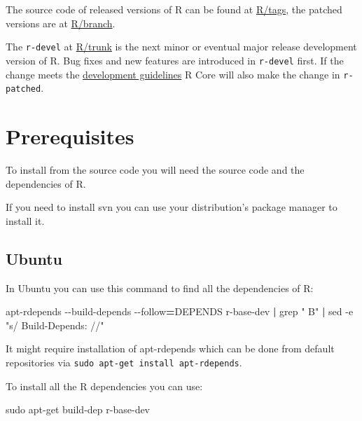 \documentclass[
]{book}
\newenvironment{Shaded}{\begin{snugshade}}{\end{snugshade}}
\newcommand{\AttributeTok}[1]{\textcolor[rgb]{0.77,0.63,0.00}{#1}}
\newcommand{\ExtensionTok}[1]{#1}
\newcommand{\FunctionTok}[1]{\textcolor[rgb]{0.00,0.00,0.00}{#1}}
\newcommand{\KeywordTok}[1]{\textcolor[rgb]{0.13,0.29,0.53}{\textbf{#1}}}
\newcommand{\NormalTok}[1]{#1}
\newcommand{\OperatorTok}[1]{\textcolor[rgb]{0.81,0.36,0.00}{\textbf{#1}}}
\newcommand{\StringTok}[1]{\textcolor[rgb]{0.31,0.60,0.02}{#1}}
\begin{document}
The source code of released versions of R can be found at \href{https://svn.r-project.org/R/tags/}{R/tags}, the patched versions are at \href{https://svn.r-project.org/R/branches/}{R/branch}.

The \texttt{r-devel} at \href{https://svn.r-project.org/R/trunk}{R/trunk} is the next minor or eventual major release development version of R.
Bug fixes and new features are introduced in \texttt{r-devel} first.
If the change meets the \href{https://developer.r-project.org/devel-guidelines.txt}{development guidelines} R Core will also make the change in \texttt{r-patched}.

\hypertarget{prerequisites}{%
\section{Prerequisites}\label{prerequisites}}

To install from the source code you will need the source code and the dependencies of R.

If you need to install svn you can use your distribution's package manager to install it.

\hypertarget{ubuntu}{%
\subsection{Ubuntu}\label{ubuntu}}

In Ubuntu you can use this command to find all the dependencies of R:

\begin{Shaded}
\begin{Highlighting}[]
\ExtensionTok{apt{-}rdepends} \AttributeTok{{-}{-}build{-}depends} \AttributeTok{{-}{-}follow}\OperatorTok{=}\NormalTok{DEPENDS r{-}base{-}dev }\KeywordTok{|} \FunctionTok{grep} \StringTok{" B"} \KeywordTok{|} \FunctionTok{sed} \AttributeTok{{-}e} \StringTok{"s/  Build{-}Depends: //"}
\end{Highlighting}
\end{Shaded}

It might require installation of apt-rdepends which can be done from default repositories via \texttt{sudo\ apt-get\ install\ apt-rdepends}.

To install all the R dependencies you can use:

\begin{Shaded}
\begin{Highlighting}[]
\FunctionTok{sudo}\NormalTok{ apt{-}get build{-}dep r{-}base{-}dev}
\end{Highlighting}
\end{Shaded}
\end{document}
